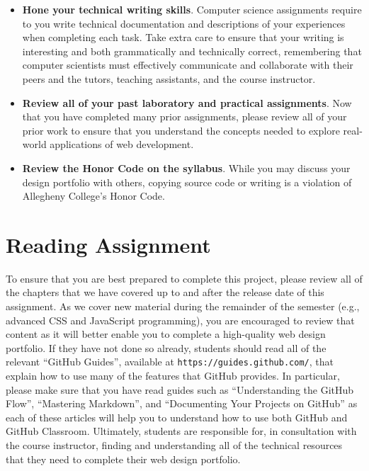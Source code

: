 \documentclass[11pt]{article}
\newcommand{\url}[1]{\lstinline{#1}}
\begin{document}
\begin{itemize}
\item {\bf Hone your technical writing skills}. Computer science assignments
  require to you write technical documentation and descriptions of your
  experiences when completing each task. Take extra care to ensure that your
  writing is interesting and both grammatically and technically correct,
  remembering that computer scientists must effectively communicate and
  collaborate with their peers and the tutors, teaching assistants, and the
  course instructor.

\item {\bf Review all of your past laboratory and practical assignments}. Now
  that you have completed many prior assignments, please review all of your
  prior work to ensure that you understand the concepts needed to explore
  real-world applications of web development.

\item {\bf Review the Honor Code on the syllabus}. While you may discuss your
  design portfolio with others, copying source code or writing is a violation of
  Allegheny College's Honor Code.

\end{itemize}

\vspace*{-.15in}

\section*{Reading Assignment}

To ensure that you are best prepared to complete this project, please review all
of the chapters that we have covered up to and after the release date of this
assignment. As we cover new material during the remainder of the semester (e.g.,
advanced CSS and JavaScript programming), you are encouraged to review that
content as it will better enable you to complete a high-quality web design
portfolio.
%
If they have not done so already, students should read all of the relevant
``GitHub Guides'', available at \url{https://guides.github.com/}, that explain
how to use many of the features that GitHub provides. In particular, please make
sure that you have read guides such as ``Understanding the GitHub Flow'',
``Mastering Markdown'', and ``Documenting Your Projects on GitHub'' as each of
these articles will help you to understand how to use both GitHub and GitHub
Classroom.
%
Ultimately, students are responsible for, in consultation with the course
instructor, finding and understanding all of the technical resources that they
need to complete their web design portfolio.
\end{document}
